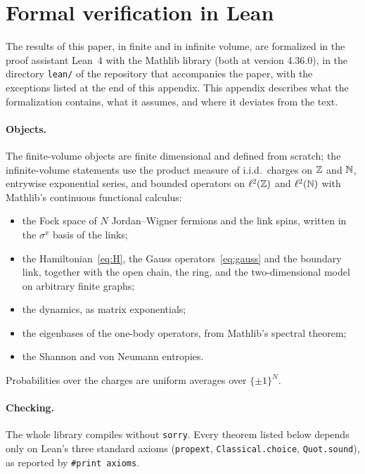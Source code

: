 \section{Formal verification in Lean}\label{app:lean}

The results of this paper, in finite and in infinite volume, are formalized in the proof assistant Lean~4 with the
Mathlib library (both at version 4.36.0), in the directory \texttt{lean/} of the repository that
accompanies the paper, with the exceptions listed at the end of this appendix.  This appendix describes what the
formalization contains, what it assumes, and where it deviates from the text.

\paragraph{Objects.}  The finite-volume objects are finite dimensional and defined from scratch; the infinite-volume
statements use the product measure of i.i.d.\ charges on $\mathbb{Z}$ and $\mathbb{N}$, entrywise exponential series, and bounded
operators on $\ell^2(\mathbb{Z})$ and $\ell^2(\mathbb{N})$ with Mathlib's continuous functional calculus:
\begin{itemize}
\item the Fock space of $N$ Jordan--Wigner fermions and the link spins, written in the $\sigma^x$
basis of the links;
\item the Hamiltonian~\eqref{eq:H}, the Gauss operators~\eqref{eq:gauss} and the boundary link, together
with the open chain, the ring, and the two-dimensional model on arbitrary finite graphs;
\item the dynamics, as matrix exponentials;
\item the eigenbases of the one-body operators, from Mathlib's spectral theorem;
\item the Shannon and von Neumann entropies.
\end{itemize}
Probabilities over the charges are uniform averages over $\{\pm1\}^N$.

\paragraph{Checking.}  The whole library compiles without \texttt{sorry}.  Every theorem listed below
depends only on Lean's three standard axioms (\texttt{propext}, \texttt{Classical.choice},
\texttt{Quot.sound}), as reported by \texttt{\#print axioms}.

